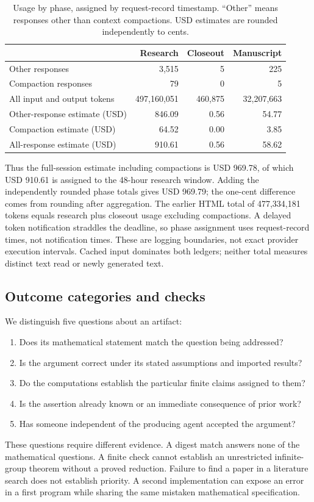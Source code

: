 \begin{table}[ht]
\centering\small
\caption{Usage by phase, assigned by request-record timestamp.
``Other'' means responses other than context compactions.
USD estimates are rounded independently to cents.}
\label{tab:phase-usage}
\begin{tabular}{lrrr}
\toprule
 & Research & Closeout & Manuscript\\
\midrule
Other responses & 3,515 & 5 & 225\\
Compaction responses & 79 & 0 & 5\\
All input and output tokens & 497,160,051 & 460,875 & 32,207,663\\
Other-response estimate (USD) & 846.09 & 0.56 & 54.77\\
Compaction estimate (USD) & 64.52 & 0.00 & 3.85\\
All-response estimate (USD) & 910.61 & 0.56 & 58.62\\
\bottomrule
\end{tabular}
\end{table}

Thus the full-session estimate including compactions is USD 969.78,
of which USD 910.61 is assigned to the 48-hour research window.
Adding the independently rounded phase totals gives USD 969.79;
the one-cent difference comes from rounding after aggregation.
The earlier HTML total of 477,334,181 tokens equals research plus
closeout usage excluding compactions. A delayed token notification
straddles the deadline, so phase assignment uses request-record times,
not notification times. These are logging boundaries, not exact
provider execution intervals. Cached input dominates both ledgers;
neither total measures distinct text read or newly generated text.

\subsection{Outcome categories and checks}

We distinguish five questions about an artifact:
\begin{enumerate}
\item Does its mathematical statement match the question being addressed?
\item Is the argument correct under its stated assumptions and imported results?
\item Do the computations establish the particular finite claims assigned to them?
\item Is the assertion already known or an immediate consequence of prior work?
\item Has someone independent of the producing agent accepted the argument?
\end{enumerate}
These questions require different evidence. A digest match answers
none of the mathematical questions. A finite check cannot establish
an unrestricted infinite-group theorem without a proved reduction.
Failure to find a paper in a literature search does not establish
priority. A second implementation can expose an error in a first
program while sharing the same mistaken mathematical specification.

